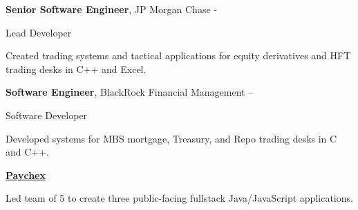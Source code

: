 \documentclass[MMMMyyyy,nonstopmode]{simpleresumecv_stacked}
\newif\ifLOCATION
\begin{document}
\begin{Body}
\begin{Detail}
\end{Detail}

\Gap
\Entry
\textbf{Senior Software Engineer}, JP Morgan Chase
\hfill 
 - 

Lead Developer
\ifLOCATION
\hfill
New York, New York
\fi

\begin{Detail}
Created trading systems and tactical applications for equity derivatives and HFT trading desks in C++ and Excel.

\end{Detail}

\Entry
\textbf{Software Engineer}, BlackRock Financial Management
\hfill 
 --  

Software Developer
\ifLOCATION
\hfill
New York, New York
\fi

\begin{Detail}
Developed systems for MBS mortgage, Treasury, and Repo trading desks in C and C++.
\end{Detail}

\iffalse
\BigGap
\Entry
\textbf{Prophet 21, Inc.}
\hfill 
Yardley, Pennsylvania

Associate Developer
\hfill
\DatestampYM{1992}{06} --  \DatestampYM{1993}{03}

\begin{Detail}
\BulletItem
Wrote and maintained features for point-of-sale systems targeted to retailers and wholesalers

\Gap
Technologies: Sybase, ksh
\end{Detail}
\fi

\else

\iffalse %
\BigGap
\Entry
\href{http://www.paychex.com/}
{\textbf{Paychex}}

\begin{Detail}
	Led team of 5 to create three public-facing fullstack Java/JavaScript applications.


\end{Detail}
\end{Body}
\end{document}
